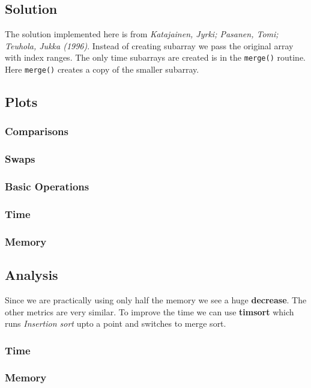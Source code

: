 \documentclass[12pt]{article}
\begin{document}
\subsection{Solution}
The solution implemented here is from
\textit{Katajainen, Jyrki; Pasanen, Tomi; Teuhola, Jukka (1996)}.
Instead of creating subarray we pass the original array with index ranges.
The only time subarrays are created is in the \texttt{merge()} routine.
Here \texttt{merge()} creates a copy of the smaller subarray.
\subsection{Plots}
\subsubsection{Comparisons}

\subsubsection{Swaps}

\subsubsection{Basic Operations}

\subsubsection{Time}

\subsubsection{Memory}

\subsection{Analysis}
Since we are practically using only half the memory we see a huge
\textbf{decrease}. The other metrics are very similar. To improve the time
we can use \textbf{timsort} which runs \textit{Insertion sort} upto a point
and switches to merge sort.
\subsubsection{Time}

\subsubsection{Memory}

\end{document}
